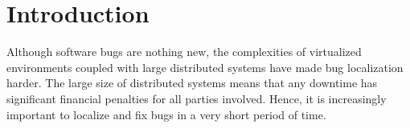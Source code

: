 \chapter{Introduction}
\label{section:intro}

Although software bugs are nothing new, the complexities of virtualized environments coupled with large distributed systems have made bug localization harder.
The large size of distributed systems means that any downtime has significant financial penalties for all parties involved.
Hence, it is increasingly important to localize and fix bugs in a very short period of time.







